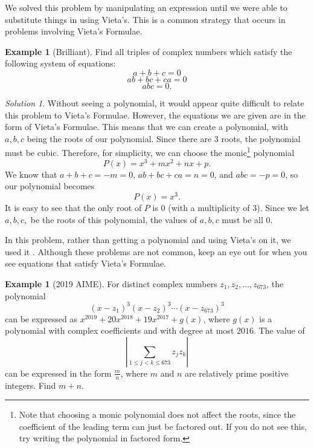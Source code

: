 \documentclass[l1pt]{article}
\theoremstyle{plain}
\theoremstyle{definition}
\newtheorem{example}[thm]{Example}
\theoremstyle{remark}
\newtheorem*{solution}{Solution}
\begin{document}
 We solved this problem by manipulating an expression until we were able to substitute things in using Vieta's. This is a common strategy that occurs in problems involving Vieta's Formulae.
 
 \begin{example}[Brilliant]
 Find all triples of complex numbers which satisfy the following system of equations: 
 \[a+b+c=0\] \[ab+bc+ca=0\] \[abc=0.\]
 \end{example}
 
 \begin{solution}
 Without seeing a polynomial, it would appear quite difficult to relate this problem to Vieta's Formulae. However, the equations we are given are in the form of Vieta's Formulae. This means that we can create a polynomial, with $a, b, c$ being the roots of our polynomial. Since there are 3 roots, the polynomial must be cubic. Therefore, for simplicity, we can choose the monic\footnote{Note that choosing a monic polynomial does not affect the roots, since the coefficient of the leading term can just be factored out. If you do not see this, try writing the polynomial in factored form.} polynomial \[P(x)=x^3+mx^2+nx+p.\] We know that $a+b+c=-m=0$, $ab+bc+ca=n=0$, and $abc=-p=0$, so our polynomial becomes \[P(x)=x^3.\] It is easy to see that the only root of $P$ is 0 (with a multiplicity of 3). Since we let $a, b, c,$ be the roots of this polynomial, the values of $a, b, c$ must be all 0.
 \end{solution}
 
 In this problem, rather than getting a polynomial and using Vieta's on it, we used it . Although these problems are not common, keep an eye out for when you see equations that satisfy Vieta's Formulae.

\begin{example}[2019 AIME]
For distinct complex numbers $z_1,z_2,\dots,z_{673}$, the polynomial
\[ (x-z_1)^3(x-z_2)^3 \cdots (x-z_{673})^3 \]can be expressed as $x^{2019} + 20x^{2018} + 19x^{2017}+g(x)$, where $g(x)$ is a polynomial with complex coefficients and with degree at most $2016$. The value of
\[ \left| \sum_{1 \le j <k \le 673} z_jz_k \right| \]can be expressed in the form $\tfrac{m}{n}$, where $m$ and $n$ are relatively prime positive integers. Find $m+n$.
\end{example}
\end{document}
